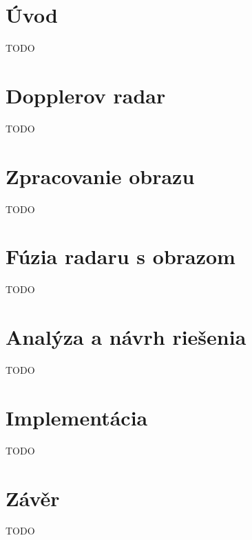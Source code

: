 \chapter{Úvod}
\label{uvod}
TODO

\chapter {Dopplerov radar}
\label{doppler}
TODO

\chapter {Zpracovanie obrazu}
\label{camera}
TODO

\chapter{Fúzia radaru s obrazom}
\label{fusion}
TODO

\chapter{Analýza a návrh riešenia}
\label{analysis}
TODO

\chapter{Implementácia}
\label{implementation}
TODO

\chapter{Závěr}
\label{zaver}
TODO

\nocite{Chavez-Garcia}



